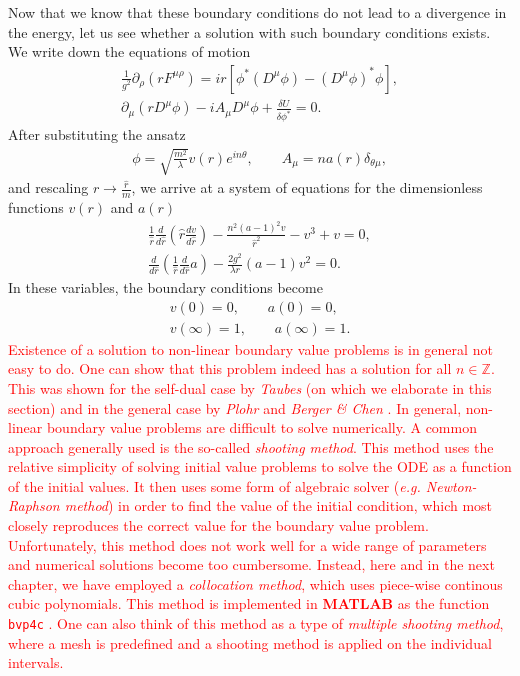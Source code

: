     \indent Now that we know that these boundary conditions do not lead to a divergence in the energy, let us see whether a solution with such boundary conditions exists. We write down the equations of motion
    \begin{align}
        \frac{1}{g^2}  \partial_{\rho}(r F^{\mu \rho}) = i r \left[\phi^* \left(D^{\mu}\phi\right) - \left(D^{\mu}\phi \right)^* \phi \right], \nonumber \\
        \partial_{\mu} \left(r D^{\mu} \phi \right) - i A_{\mu} D^{\mu} \phi + \frac{\delta U}{\delta \phi^*} =0.
    \end{align}
    After substituting the ansatz
    \begin{align}
        \phi = \sqrt{\frac{m^2}{\lambda}}v(r) e^{i n \theta}, \qquad A_{\mu} = n a(r) \delta_{\theta \mu},
    \end{align}
    and rescaling $r\rightarrow \frac{\hat{r}}{m}$, we arrive at a system of equations for the dimensionless functions $v(r)$ and $a(r)$
    \begin{align}
        \frac{1}{\hat{r}} \frac{d }{d \hat{r}} \left(\hat{r} \frac{d v}{d \hat{r}} \right) - \frac{n^2 (a-1)^2 v}{\hat{r}^2} -v^3 +v =0,  \\
        \frac{d}{d \hat{r}}\left(\frac{1}{\hat{r}}\frac{d}{d \hat{r}} a \right)- \frac{2 g^2}{\lambda r} (a-1)v^2=0.
    \end{align}
    In these variables, the boundary conditions become
    \begin{align}
        v(0) = 0, \qquad a(0)=0, \\
        v(\infty) =1, \qquad a(\infty) =1.
    \end{align}
    \textcolor{red}{Existence of a solution to non-linear boundary value problems is in general not easy to do. One can show that this problem indeed has a solution for all $n\in \mathbb{Z}$. This was shown for the self-dual case by \textit{Taubes} \cite{Taubes1980_1, Taubes1980_2} (on which we elaborate in this section) and in the general case by \textit{Plohr} and \textit{Berger \& Chen} \cite{Plohr1981, Berger1989}. In general, non-linear boundary value problems are difficult to solve numerically. A common approach generally used is the so-called \textit{shooting method}. This method uses the relative simplicity of solving initial value problems to solve the ODE as a function of the initial values. It then uses some form of algebraic solver (\textit{e.g. Newton-Raphson method}) in order to find the value of the initial condition, which most closely reproduces the correct value for the boundary value problem. Unfortunately, this method does not work well for a wide range of parameters and numerical solutions become too cumbersome. Instead, here and in the next chapter, we have employed a \textit{collocation method}, which uses piece-wise continous cubic polynomials. This method is implemented in \textbf{MATLAB} as the function \texttt{bvp4c} \cite{Kierzenka2001}. One can also think of this method as a type of \textit{multiple shooting method}, where a mesh is predefined and a shooting method is applied on the individual intervals. }\\

